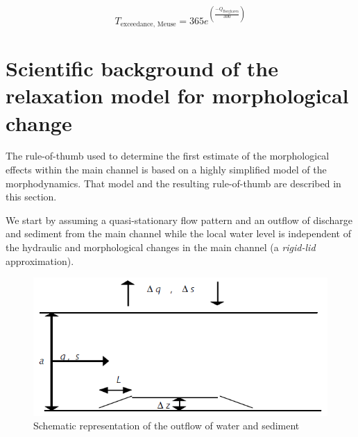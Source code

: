 \begin{equation}
\label{Eq1b}
T_\text{exceedance, Meuse} = 365 e^{\left ( \frac{-  Q_\text{Borgharen}}{300} \right )}
\end{equation}

\section{Scientific background of the relaxation model for morphological change}

The rule-of-thumb used to determine the first estimate of the morphological effects within the main channel is based on a highly simplified model of the morphodynamics.
That model and the resulting rule-of-thumb are described in this section.

We start by assuming a quasi-stationary flow pattern and an outflow of discharge and sediment from the main channel while the local water level is independent of the hydraulic and morphological changes in the main channel (a \emph{rigid-lid} approximation).

\begin{figure}
\includegraphics[width=\columnwidth]{figures/Fig4.png}
\caption{Schematic representation of the outflow of water and sediment}
\label{Fig4}
\end{figure}

